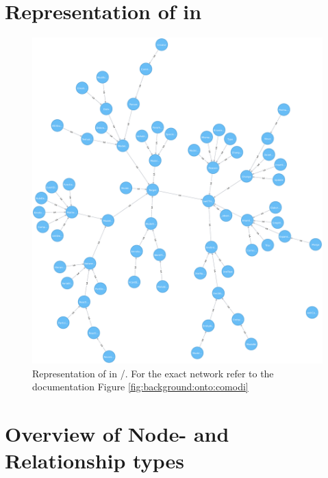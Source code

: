 \chapter{Representation of \comodi in \masymos}
\begin{figure}[H]
	\centering
	\includegraphics[width=\textwidth,height=0.5\textheight,keepaspectratio]{resources/neo4j-renders/comodi.pdf}
	\caption[Representation of \comodi in \masymos/\neoj]{Representation of \comodi in \masymos/\neoj. For the exact network refer to the documentation Figure \ref{fig:background:onto:comodi}}
	\label{fig:appendix:neo4j-comodi}
\end{figure}

\chapter{Overview of Node- and Relationship types}
\label{sec:appendix:meta-map}

